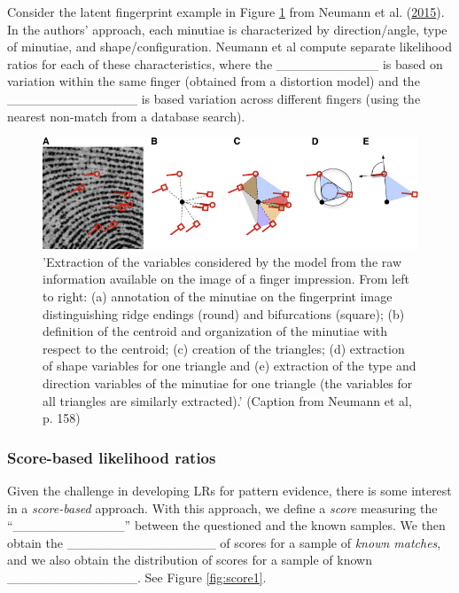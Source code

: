 \documentclass[]{book}
\theoremstyle{definition}
\theoremstyle{definition}
\theoremstyle{remark}
\begin{document}
Consider the latent fingerprint example in Figure \ref{fig:finger} from
Neumann et al. (\protect\hyperlink{ref-neumann15}{2015}). In the
authors' approach, each minutiae is characterized by direction/angle,
type of minutiae, and shape/configuration. Neumann et al compute
separate likelihood ratios for each of these characteristics, where the
\_\_\_\_\_\_\_\_\_\_\_ is based on variation within the same finger
(obtained from a distortion model) and the \_\_\_\_\_\_\_\_\_\_\_\_\_\_
is based variation across different fingers (using the nearest non-match
from a database search).

\begin{figure}

{\centering \includegraphics[width=.75\linewidth]{img/neumannfinger} 

}

\caption{'Extraction of the variables considered by the model from the raw information available on the image of a finger impression. From left to right: (a) annotation of the minutiae on the fingerprint image distinguishing ridge endings (round) and bifurcations (square); (b) definition of the centroid and organization of the minutiae with respect to the centroid; (c) creation of the triangles; (d) extraction of shape variables for one triangle and (e) extraction of the type and direction variables of the minutiae for one triangle (the variables for all triangles are similarly extracted).' (Caption from Neumann et al, p. 158)}\label{fig:finger}
\end{figure}

\subsubsection{Score-based likelihood
ratios}\label{score-based-likelihood-ratios}

Given the challenge in developing LRs for pattern evidence, there is
some interest in a \emph{score-based} approach. With this approach, we
define a \emph{score} measuring the ``\_\_\_\_\_\_\_\_\_\_\_\_'' between
the questioned and the known samples. We then obtain the
\_\_\_\_\_\_\_\_\_\_\_\_\_\_\_\_ of scores for a sample of \emph{known
matches}, and we also obtain the distribution of scores for a sample of
known \_\_\_\_\_\_\_\_\_\_\_\_\_\_. See Figure \ref{fig:score1}.
\end{document}
